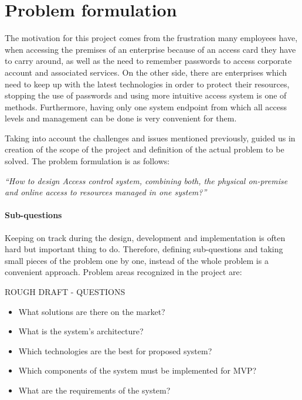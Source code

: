 \section{Problem formulation} \label{problemFormulation}
The motivation for this project comes from the frustration many employees have, when accessing the premises of an enterprise because of an access card they have to carry around, as well as the need to remember passwords to access corporate account and associated services.
On the other side, there are enterprises which need to keep up with the latest technologies in order to protect their resources, stopping the use of passwords and using more intuitive access system is one of methods. Furthermore, having only one system endpoint from which all access levels and management can be done is very convenient for them.

Taking into account the challenges and issues mentioned previously, guided us in creation of the scope of the project and definition of the actual problem to be solved. The problem formulation is as follows:

\begin{center}
    \textit{“How to design Access control system, combining both, the physical on-premise and online access to resources managed in one system?”}
\end{center}

\paragraph{Sub-questions}
Keeping on track during the design, development and implementation is often hard but important thing to do. Therefore, defining sub-questions and taking small pieces of the problem one by one, instead of the whole problem is a convenient approach. Problem areas recognized in the project are:

ROUGH DRAFT - QUESTIONS
\begin{itemize}[noitemsep]
    \item What solutions are there on the market?
    \item What is the system’s architecture?
    \item Which technologies are the best for proposed system?
    \item Which components of the system must be implemented for MVP?
    \item What are the requirements of the system?
\end{itemize}